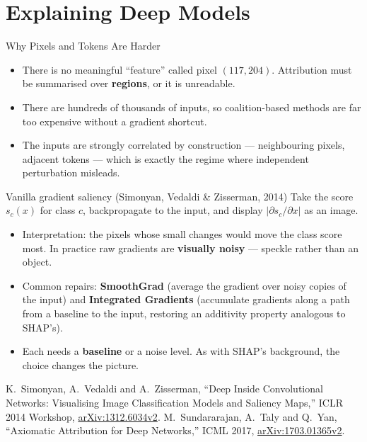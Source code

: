 \section{Explaining Deep Models}

\begin{frame}[allowframebreaks]{Why Pixels and Tokens Are Harder}

    \begin{itemize}\small
        \setlength\itemsep{0.35em}
        \item There is no meaningful ``feature'' called pixel $(117,204)$. Attribution must be
              summarised over \textbf{regions}, or it is unreadable.
        \item There are hundreds of thousands of inputs, so coalition-based methods are far too
              expensive without a gradient shortcut.
        \item The inputs are strongly correlated by construction --- neighbouring pixels, adjacent
              tokens --- which is exactly the regime where independent perturbation misleads.
    \end{itemize}

    \vspace{0.5em}

    \begin{block}{Vanilla gradient saliency (Simonyan, Vedaldi \& Zisserman, 2014)}
        Take the score $s_c(x)$ for class $c$, backpropagate to the input, and display
        $\bigl|\partial s_c / \partial x\bigr|$ as an image.
    \end{block}

    \vspace{0.5em}

    \begin{itemize}\small
        \setlength\itemsep{0.3em}
        \item Interpretation: the pixels whose small changes would move the class score most.
              In practice raw gradients are \textbf{visually noisy} --- speckle rather than an object.
        \item Common repairs: \textbf{SmoothGrad} (average the gradient over noisy copies of the
              input) and \textbf{Integrated Gradients} (accumulate gradients along a path from a
              baseline to the input, restoring an additivity property analogous to SHAP's).
        \item Each needs a \textbf{baseline} or a noise level. As with SHAP's background, the
              choice changes the picture.
    \end{itemize}

    \vspace{0.3em}
    {\scriptsize K.~Simonyan, A.~Vedaldi and A.~Zisserman, ``Deep Inside Convolutional Networks:
    Visualising Image Classification Models and Saliency Maps,'' ICLR 2014 Workshop,
    \href{https://arxiv.org/abs/1312.6034v2}{arXiv:1312.6034v2}. M.~Sundararajan, A.~Taly and Q.~Yan,
    ``Axiomatic Attribution for Deep Networks,'' ICML 2017,
    \href{https://arxiv.org/abs/1703.01365v2}{arXiv:1703.01365v2}.}
\end{frame}


